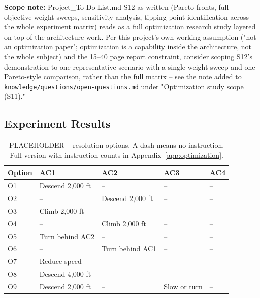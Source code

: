 

\textbf{Scope note:} Project\_To-Do List.md S12 as written (Pareto fronts,
full objective-weight sweeps, sensitivity analysis, tipping-point
identification across the whole experiment matrix) reads as a full
optimization research study layered on top of the architecture work. Per
this project's own working assumption ("not an optimization paper";
optimization is a capability inside the architecture, not the whole
subject) and the 15--40 page report constraint, consider scoping S12's
demonstration to one representative scenario with a single weight sweep
and one Pareto-style comparison, rather than the full matrix -- see the
note added to \texttt{knowledge/questions/open-questions.md} under
"Optimization study scope (S11)."

\subsection{Experiment Results}
\label{sec:experiment-results}

\begin{table}[h]
\centering
\caption{PLACEHOLDER -- resolution options. A dash means no instruction.
Full version with instruction counts in Appendix~\ref{app:optimization}.}
\label{tab:options}
\begin{tabular}{@{}lllll@{}}
\toprule
Option & AC1 & AC2 & AC3 & AC4 \\
\midrule
O1 & Descend 2,000 ft & -- & -- & -- \\
O2 & -- & Descend 2,000 ft & -- & -- \\
O3 & Climb 2,000 ft & -- & -- & -- \\
O4 & -- & Climb 2,000 ft & -- & -- \\
O5 & Turn behind AC2 & -- & -- & -- \\
O6 & -- & Turn behind AC1 & -- & -- \\
O7 & Reduce speed & -- & -- & -- \\
O8 & Descend 4,000 ft & -- & -- & -- \\
O9 & Descend 2,000 ft & -- & Slow or turn & -- \\
\bottomrule
\end{tabular}
\end{table}

